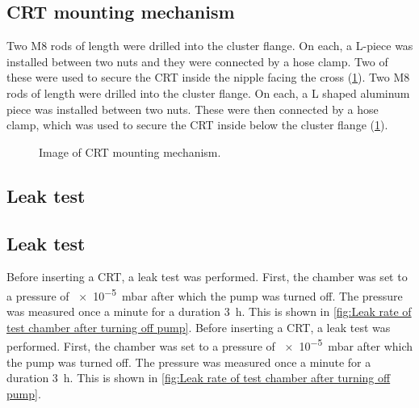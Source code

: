 \subsection{CRT mounting mechanism}
\label{subsec:CRT mounting mechanism}

 Two M8 rods of length  were drilled into the cluster flange. On each, a L-piece was installed between two nuts and they were connected by a hose clamp. Two of these were used to secure the CRT inside the nipple facing the cross (\cref{fig:Image of CRT mounting mechanism}).
 Two M8 rods of length  were drilled  into the cluster flange. On each, a L shaped aluminum piece was installed between two nuts. These were then connected by a hose clamp, which was used to secure the CRT inside below the cluster flange (\cref{fig:Image of CRT mounting mechanism}).
 

\begin{figure}[h]
	\centering
	
	
	\caption{Image of CRT mounting mechanism.}
	\label{fig:Image of CRT mounting mechanism}
\end{figure}


\subsection{Leak test}
\subsection{Leak test} 
\label{subsec:Leak test}

Before inserting a CRT, a leak test was performed. First, the chamber was set to a pressure of \SI{e-5}{\milli\bar} after which the pump was turned off. The pressure was measured once a minute for a duration \SI{3}{\hour}. This is shown in \cref{fig:Leak rate of test chamber after turning off pump}.
Before inserting a CRT, a leak test was performed. First, the chamber was set to a pressure of \SI{e-5}{\milli\bar} after which the pump was turned off. The pressure was measured once a minute for a duration \SI{3}{\hour}. This is shown in \cref{fig:Leak rate of test chamber after turning off pump}. 

